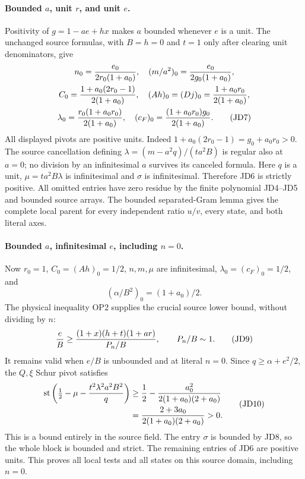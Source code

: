 \paragraph{Bounded $a$, unit $r$, and unit $e$.}
Positivity of $g=1-ae+hx$ makes $a$ bounded whenever $e$ is a unit.
The unchanged source formulas, with $B=h=0$ and $t=1$ only after
clearing unit denominators, give
\[
 \begin{gathered}
 n_0={e_0\over2r_0(1+a_0)},\quad
 (m/a^2)_0={e_0\over2g_0(1+a_0)},\\
 C_0={1+a_0(2r_0-1)\over2(1+a_0)},\quad
 (Ah)_0=(Dj)_0={1+a_0r_0\over2(1+a_0)},\\
 \lambda_0={r_0(1+a_0r_0)\over2(1+a_0)},\quad
 (c_F)_0={(1+a_0r_0)g_0\over2(1+a_0)}.                \tag{JD7}
 \end{gathered}
\]
All displayed pivots are positive units.  Indeed
$1+a_0(2r_0-1)=g_0+a_0r_0>0$.  The source cancellation defining
$\lambda=(m-a^2q)/(ta^2B)$ is regular also at $a=0$; no division
by an infinitesimal $a$ survives its canceled formula.
Here $q$ is a unit, $\mu=ta^2B\lambda$ is infinitesimal and
$\sigma$ is infinitesimal.  Therefore JD6 is strictly positive.
All omitted entries have zero residue by the finite polynomial
JD4--JD5 and bounded source arrays.  The bounded separated-Gram
lemma gives the complete local parent for every independent ratio
$u/v$, every state, and both literal axes.

\paragraph{Bounded $a$, infinitesimal $e$, including $n=0$.}
Now $r_0=1$, $C_0=(Ah)_0=1/2$, $n,m,\mu$ are infinitesimal,
$\lambda_0=(c_F)_0=1/2$, and
\[
                    (\alpha/B^2)_0=(1+a_0)/2.         \tag{JD8}
\]
The physical inequality OP2 supplies the crucial source lower bound,
without dividing by $n$:
\[
 {e\over B}\ge
 {(1+x)(h+t)(1+ar)\over P_n/B},\qquad P_n/B\sim1.
                                                               \tag{JD9}
\]
It remains valid when $e/B$ is unbounded and at literal $n=0$.
Since $q\ge\alpha+e^2/2$, the $Q,\xi$ Schur pivot satisfies
\[
 \begin{split}
 \operatorname{st}\left(\tfrac12-\mu
                 -{t^2\lambda^2a^2B^2\over q}\right)
 &\ge {1\over2}-{a_0^2\over2(1+a_0)(2+a_0)}\\
 &= {2+3a_0\over2(1+a_0)(2+a_0)}>0.                  
 \end{split}\tag{JD10}
\]
This is a bound entirely in the source field.  The entry $\sigma$
is bounded by JD8, so the whole block is bounded and strict.
The remaining entries of JD6 are positive units.  This proves all
local tests and all states on this source domain, including $n=0$.

